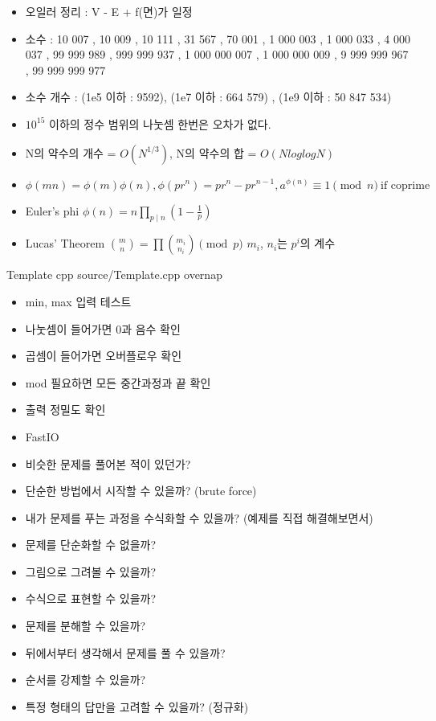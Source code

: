 \documentclass[landscape, 10pt, a4paper, oneside, twocolumn]{extarticle}
\begin{document}
\begin{itemize}
\item 오일러 정리 : V - E + f(면)가 일정
\item 소수 : 10 007 , 10 009 , 10 111 , 31 567 , 70 001 , 1 000 003 , 1 000 033 , 4 000 037 , 99 999 989 , 999 999 937 , 1 000 000 007 , 1 000 000 009 , 9 999 999 967 , 99 999 999 977
\item 소수 개수 : (1e5 이하 : 9592), (1e7 이하 : 664 579) , (1e9 이하 : 50 847 534) 
\item $10^{15}$ 이하의 정수 범위의 나눗셈 한번은 오차가 없다.
\item N의 약수의 개수 = $O(N^{1/3})$, N의 약수의 합 = $O(NloglogN)$
\item $\phi(mn) = \phi(m) \phi(n) , \phi(pr^n) = pr^n - pr^{n-1} , a^{\phi(n)} \equiv 1 \pmod{n} \ \text{if coprime}$
\end{itemize}

\begin{itemize}
\item Euler's phi $\phi (n)=n\prod _{p\mid n}\left(1-{\frac {1}{p}}\right)$
\item Lucas' Theorem $\binom{m}{n}=\prod\binom{m_i}{n_i} \pmod p$ $m_i$, $n_i$는 $p^i$의 계수
\end{itemize}

\Algorithm
{Template}
{}
{}
{cpp}
{source/Template.cpp}
{overnap}


\begin{itemize}
\item min, max 입력 테스트
\item 나눗셈이 들어가면 0과 음수 확인
\item 곱셈이 들어가면 오버플로우 확인
\item mod 필요하면 모든 중간과정과 끝 확인
\item 출력 정밀도 확인
\item FastIO
\end{itemize}


\begin{itemize}
\item 비슷한 문제를 풀어본 적이 있던가?
\item 단순한 방법에서 시작할 수 있을까? (brute force)
\item 내가 문제를 푸는 과정을 수식화할 수 있을까? (예제를 직접 해결해보면서)
\item 문제를 단순화할 수 없을까?
\item 그림으로 그려볼 수 있을까?
\item 수식으로 표현할 수 있을까?
\item 문제를 분해할 수 있을까?
\item 뒤에서부터 생각해서 문제를 풀 수 있을까?
\item 순서를 강제할 수 있을까?
\item 특정 형태의 답만을 고려할 수 있을까? (정규화)
\end{itemize}
\end{document}
